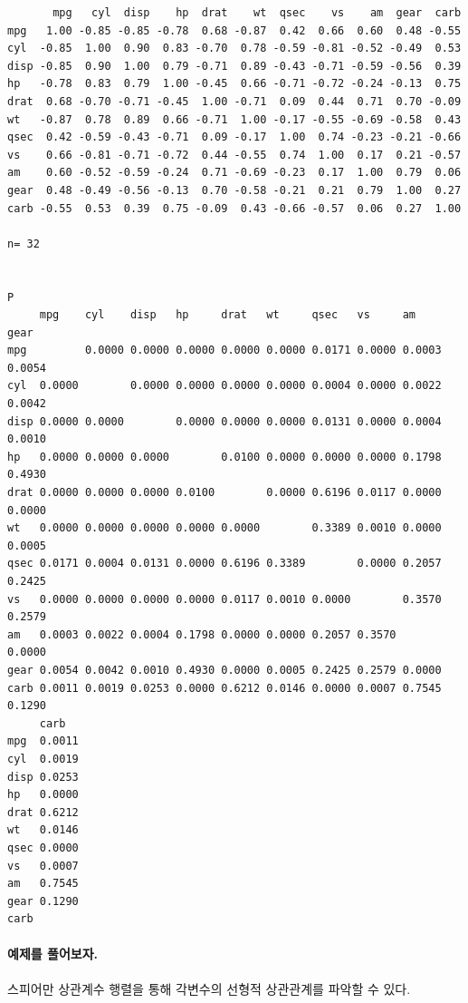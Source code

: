 \documentclass[]{article}
\let\oldparagraph\paragraph
\renewcommand{\paragraph}[1]{\oldparagraph{#1}\mbox{}}
\begin{document}
\begin{verbatim}
       mpg   cyl  disp    hp  drat    wt  qsec    vs    am  gear  carb
mpg   1.00 -0.85 -0.85 -0.78  0.68 -0.87  0.42  0.66  0.60  0.48 -0.55
cyl  -0.85  1.00  0.90  0.83 -0.70  0.78 -0.59 -0.81 -0.52 -0.49  0.53
disp -0.85  0.90  1.00  0.79 -0.71  0.89 -0.43 -0.71 -0.59 -0.56  0.39
hp   -0.78  0.83  0.79  1.00 -0.45  0.66 -0.71 -0.72 -0.24 -0.13  0.75
drat  0.68 -0.70 -0.71 -0.45  1.00 -0.71  0.09  0.44  0.71  0.70 -0.09
wt   -0.87  0.78  0.89  0.66 -0.71  1.00 -0.17 -0.55 -0.69 -0.58  0.43
qsec  0.42 -0.59 -0.43 -0.71  0.09 -0.17  1.00  0.74 -0.23 -0.21 -0.66
vs    0.66 -0.81 -0.71 -0.72  0.44 -0.55  0.74  1.00  0.17  0.21 -0.57
am    0.60 -0.52 -0.59 -0.24  0.71 -0.69 -0.23  0.17  1.00  0.79  0.06
gear  0.48 -0.49 -0.56 -0.13  0.70 -0.58 -0.21  0.21  0.79  1.00  0.27
carb -0.55  0.53  0.39  0.75 -0.09  0.43 -0.66 -0.57  0.06  0.27  1.00

n= 32 


P
     mpg    cyl    disp   hp     drat   wt     qsec   vs     am     gear  
mpg         0.0000 0.0000 0.0000 0.0000 0.0000 0.0171 0.0000 0.0003 0.0054
cyl  0.0000        0.0000 0.0000 0.0000 0.0000 0.0004 0.0000 0.0022 0.0042
disp 0.0000 0.0000        0.0000 0.0000 0.0000 0.0131 0.0000 0.0004 0.0010
hp   0.0000 0.0000 0.0000        0.0100 0.0000 0.0000 0.0000 0.1798 0.4930
drat 0.0000 0.0000 0.0000 0.0100        0.0000 0.6196 0.0117 0.0000 0.0000
wt   0.0000 0.0000 0.0000 0.0000 0.0000        0.3389 0.0010 0.0000 0.0005
qsec 0.0171 0.0004 0.0131 0.0000 0.6196 0.3389        0.0000 0.2057 0.2425
vs   0.0000 0.0000 0.0000 0.0000 0.0117 0.0010 0.0000        0.3570 0.2579
am   0.0003 0.0022 0.0004 0.1798 0.0000 0.0000 0.2057 0.3570        0.0000
gear 0.0054 0.0042 0.0010 0.4930 0.0000 0.0005 0.2425 0.2579 0.0000       
carb 0.0011 0.0019 0.0253 0.0000 0.6212 0.0146 0.0000 0.0007 0.7545 0.1290
     carb  
mpg  0.0011
cyl  0.0019
disp 0.0253
hp   0.0000
drat 0.6212
wt   0.0146
qsec 0.0000
vs   0.0007
am   0.7545
gear 0.1290
carb       
\end{verbatim}

\paragraph{예제를 풀어보자.}\label{-.}

스피어만 상관계수 행렬을 통해 각변수의 선형적 상관관계를 파악할 수 있다.
\end{document}
